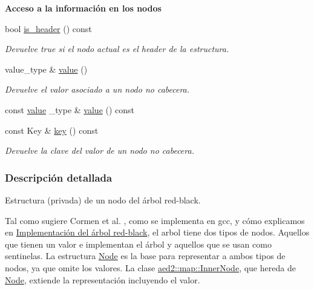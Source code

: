 \begin{Indent}{\bf \-Acceso a la información en los nodos}\par
\begin{DoxyCompactItemize}
\item 
bool \hyperlink{structaed2_1_1iterator_1_1Node_a53c20388ebe2aac8a27c9df4e1fd4775_a53c20388ebe2aac8a27c9df4e1fd4775}{is\-\_\-header} () const 
\begin{DoxyCompactList}\small\item\em \-Devuelve true si el nodo actual es el header de la estructura. \end{DoxyCompactList}\item 
value\-\_\-type \& \hyperlink{structaed2_1_1iterator_1_1Node_a968601069822105337814f963d79d635_a968601069822105337814f963d79d635}{value} ()
\begin{DoxyCompactList}\small\item\em \-Devuelve el valor asociado a un nodo no cabecera. \end{DoxyCompactList}\item 
const \hyperlink{structaed2_1_1iterator_1_1Node_a968601069822105337814f963d79d635_a968601069822105337814f963d79d635}{value} \-\_\-type \& \hyperlink{structaed2_1_1iterator_1_1Node_ac47108e837d555307d89ed4f45b769f3_ac47108e837d555307d89ed4f45b769f3}{value} () const 
\item 
const \-Key \& \hyperlink{structaed2_1_1iterator_1_1Node_a528f5bd09da14392bf64167b9188c635_a528f5bd09da14392bf64167b9188c635}{key} () const 
\begin{DoxyCompactList}\small\item\em \-Devuelve la clave del valor de un nodo no cabecera. \end{DoxyCompactList}\end{DoxyCompactItemize}
\end{Indent}


\subsubsection{\-Descripción detallada}
\-Estructura (privada) de un nodo del árbol red-\/black. 

\-Tal como sugiere \-Cormen et al. \cite{CormenLeisersonRivestStein2009}, como se implementa en gcc, y cómo explicamos en \hyperlink{Implementacion}{\-Implementación del árbol red-\/black}, el arbol tiene dos tipos de nodos. \-Aquellos que tienen un valor e implementan el árbol y aquellos que se usan como sentinelas. \-La estructura \hyperlink{structaed2_1_1iterator_1_1Node}{\-Node} es la base para representar a ambos tipos de nodos, ya que omite los valores. \-La clase \hyperlink{structaed2_1_1map_1_1InnerNode}{aed2\-::map\-::\-Inner\-Node}, que hereda de \hyperlink{structaed2_1_1iterator_1_1Node}{\-Node}, extiende la representación incluyendo el valor.

